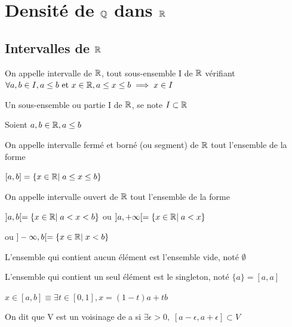 \documentclass[a4paper, 12pt]{article}
\begin{document}
\section{Densité de $\mathbb{Q}$ dans $\mathbb{R}$}

\subsection{Intervalles de $\mathbb{R}$}

\begin{definition}
    On appelle intervalle de $\mathbb{R}$, tout sous-ensemble I de $\mathbb{R}$ vérifiant
    $\forall a, b \in I, a \leq b \text{ et } x \in \mathbb{R}, a \leq x \leq b \implies x \in I$
\end{definition}

\begin{remark}
    Un sous-ensemble ou partie I de $\mathbb{R}$, se note $I \subset \mathbb{R}$
\end{remark}

\begin{definition}
    Soient $a, b \in \mathbb{R}, a \leq b$

    On appelle intervalle fermé et borné (ou segment) de $\mathbb{R}$ tout l'ensemble de la forme

    $[a, b] = \{x \in \mathbb{R} | \; a \leq x \leq b\}$
    
    \vspace{0.5em}

    On appelle intervalle ouvert de $\mathbb{R}$ tout l'ensemble de la forme

    $]a, b[ = \{x \in \mathbb{R} | \; a < x < b\}$
    \quad ou \quad
    $]a, +\infty[ = \{x \in \mathbb{R} | \; a < x\}$
    \par ou \quad
    $]-\infty, b[ = \{x \in \mathbb{R} | \; x < b\}$
\end{definition}

\begin{remark}
    L'ensemble qui contient aucun élément est l'ensemble vide, noté $\emptyset$
\end{remark}

\begin{remark}
    L'ensemble qui contient un seul élément est le singleton, noté $\{a\} = [a, a]$
\end{remark}

\begin{remark}
    $x \in [a, b] \equiv \exists t \in [0, 1], x = (1-t)a + tb$
\end{remark}

\begin{definition}
    On dit que V est un voisinage de a si $\exists \epsilon \gt 0, \; [a - \epsilon, a + \epsilon] \subset V$
\end{definition}
\end{document}
